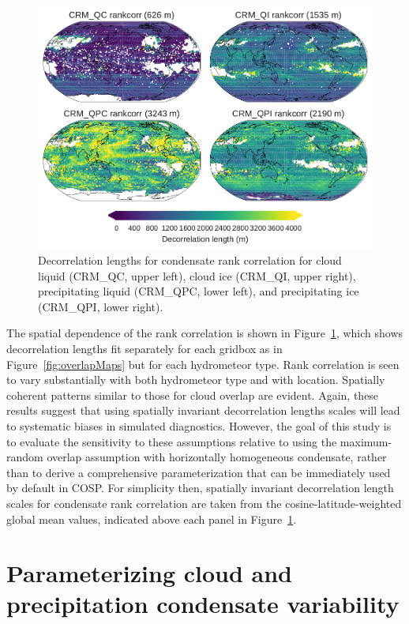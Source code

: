 \begin{figure}[htbp]
\centering
\includegraphics{graphics/subgrid2_rankcorr_maps.pdf}
\caption{\label{fig:rankcorrMaps}Decorrelation lengths for condensate
rank correlation for cloud liquid (CRM\_QC, upper left), cloud ice
(CRM\_QI, upper right), precipitating liquid (CRM\_QPC, lower left), and
precipitating ice (CRM\_QPI, lower right).}\label{fig:rankcorrMaps}
\end{figure}

The spatial dependence of the rank correlation is shown in
Figure~\ref{fig:rankcorrMaps}, which shows decorrelation lengths fit
separately for each gridbox as in Figure~\ref{fig:overlapMaps} but for
each hydrometeor type. Rank correlation is seen to vary substantially
with both hydrometeor type and with location. Spatially coherent
patterns similar to those for cloud overlap are evident. Again, these
results suggest that using spatially invariant decorrelation lengths
scales will lead to systematic biases in simulated diagnostics. However,
the goal of this study is to evaluate the sensitivity to these
assumptions relative to using the maximum-random overlap assumption with
horizontally homogeneous condensate, rather than to derive a
comprehensive parameterization that can be immediately used by default
in COSP. For simplicity then, spatially invariant decorrelation length
scales for condensate rank correlation are taken from the
cosine-latitude-weighted global mean values, indicated above each panel
in Figure~\ref{fig:rankcorrMaps}.

\section{Parameterizing cloud and precipitation condensate
variability}\label{sec:subgrid2Variability}

